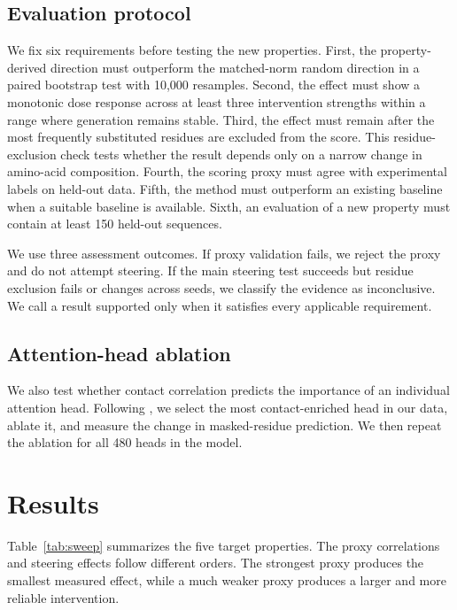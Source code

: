 \documentclass{article}
\begin{document}
\subsection{Evaluation protocol}

We fix six requirements before testing the new properties. First, the
property-derived direction must outperform the matched-norm random
direction in a paired bootstrap test with 10,000 resamples. Second, the
effect must show a monotonic dose response across at least three
intervention strengths within a range where generation remains stable.
Third, the effect must remain after the most frequently substituted
residues are excluded from the score. This residue-exclusion check tests
whether the result depends only on a narrow change in amino-acid
composition. Fourth, the scoring proxy must agree with experimental
labels on held-out data. Fifth, the method must outperform an existing
baseline when a suitable baseline is available. Sixth, an evaluation of
a new property must contain at least 150 held-out sequences.

We use three assessment outcomes. If proxy validation fails, we reject
the proxy and do not attempt steering. If the main steering test
succeeds but residue exclusion fails or changes across seeds, we
classify the evidence as inconclusive. We call a result supported only
when it satisfies every applicable requirement.

\subsection{Attention-head ablation}

We also test whether contact correlation predicts the importance of an
individual attention head. Following \citet{vig2021bertology}, we select
the most contact-enriched head in our data, ablate it, and measure the
change in masked-residue prediction. We then repeat the ablation for all
480 heads in the model.

\section{Results}
\label{sec:results}

Table~\ref{tab:sweep} summarizes the five target properties. The proxy
correlations and steering effects follow different orders. The strongest
proxy produces the smallest measured effect, while a much weaker proxy
produces a larger and more reliable intervention.
\end{document}
